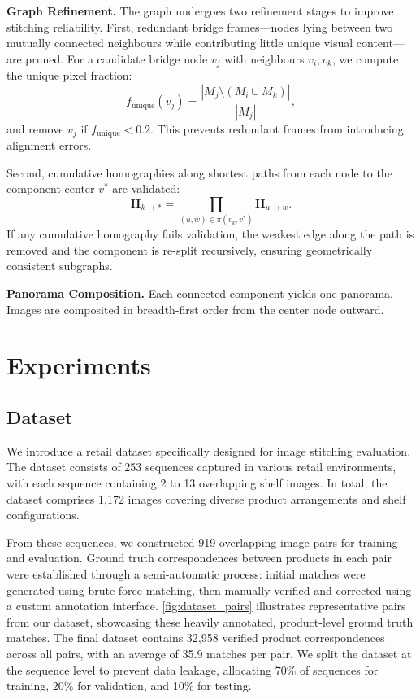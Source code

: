 \documentclass[10pt,twocolumn,letterpaper]{article}
\begin{document}
\noindent\textbf{Graph Refinement.}
The graph undergoes two refinement stages to improve stitching reliability.
First, redundant bridge frames—nodes lying between two mutually connected
neighbours while contributing little unique visual content—are pruned.
For a candidate bridge node $v_j$ with neighbours $v_i, v_k$, we compute
the unique pixel fraction:
\begin{equation}
    f_{\mathrm{unique}}(v_j) = \frac{|M_j \setminus (M_i \cup M_k)|}{|M_j|},
\end{equation}
and remove $v_j$ if $f_{\mathrm{unique}} < 0.2$. This prevents redundant
frames from introducing alignment errors.

Second, cumulative homographies along shortest paths from each node to the
component center $v^*$ are validated:
\begin{equation}
    \mathbf{H}_{k \to *} = \prod_{(u,w) \in \pi(v_k, v^*)} \mathbf{H}_{u \to w}.
\end{equation}
If any cumulative homography fails validation, the weakest edge along the
path is removed and the component is re-split recursively, ensuring
geometrically consistent subgraphs.

\noindent\textbf{Panorama Composition.}
Each connected component yields one panorama. Images are composited in
breadth-first order from the center node outward.

\section{Experiments}
\label{sec:experiments}
\subsection{Dataset}
\label{subsec:dataset}

We introduce a retail dataset specifically designed for image stitching evaluation.
The dataset consists of 253 sequences captured in various retail environments, with each sequence containing 2 to 13 overlapping shelf images.
In total, the dataset comprises 1,172 images covering diverse product arrangements and shelf configurations.

From these sequences, we constructed 919 overlapping image pairs for training and evaluation.
Ground truth correspondences between products in each pair were established through a semi-automatic process: initial matches were generated using brute-force matching, then manually verified and corrected using a custom annotation interface.
\cref{fig:dataset_pairs} illustrates representative pairs from our dataset, showcasing these heavily annotated, product-level ground truth matches.
The final dataset contains 32,958 verified product correspondences across all pairs, with an average of 35.9 matches per pair.
We split the dataset at the sequence level to prevent data leakage, allocating 70\% of sequences for training, 20\% for validation, and 10\% for testing.
\end{document}
